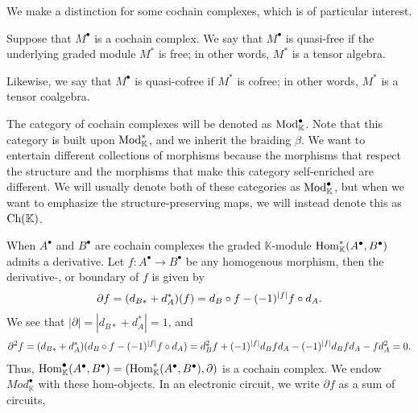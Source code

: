 \documentclass[../thesis.tex]{subfiles}
\begin{document}
            We make a distinction for some cochain complexes, which is of particular interest.
            
            \begin{definition}
                Suppose that $M^\bullet$ is a cochain complex. We say that $M^\bullet$ is quasi-free if the underlying graded module $M^*$ is free; in other words, $M^*$ is a tensor algebra.

                Likewise, we say that $M^\bullet$ is quasi-cofree if $M^*$ is cofree; in other words, $M^*$ is a tensor coalgebra.
            \end{definition}

            The category of cochain complexes will be denoted as $\tt{Mod}_\mathbb{K}^\bullet$. Note that this category is built upon $\tt{Mod}_\mathbb{K}^*$, and we inherit the braiding $\beta$. We want to entertain different collections of morphisms because the morphisms that respect the structure and the morphisms that make this category self-enriched are different. We will usually denote both of these categories as $\tt{Mod}_\mathbb{K}^\bullet$, but when we want to emphasize the structure-preserving maps, we will instead denote this as $\tt{Ch}(\mathbb{K})$.

            When $A^\bullet$ and $B^\bullet$ are cochain complexes the graded $\mathbb{K}$-module $\tt{Hom}_\mathbb{K}^*(A^\bullet, B^\bullet)$ admits a derivative. Let $f : A^\bullet \rightarrow B^\bullet$ be any homogenous morphism, then the derivative-, or boundary of $f$ is given by
            \begin{align*}
                \partial f = (d_{B*} + d_A^*)(f) = d_B \circ f - (-1)^{|f|}f\circ d_A\tt{.}
            \end{align*}
            We see that $|\partial| = |d_{B*} + d_A^*| = 1$, and
            \begin{align*}
                \partial^2f = (d_{B*} + d_A^*)(d_B \circ f - (-1)^{|f|}f\circ d_A) = d_B^2f + (-1)^{|f|}d_Bfd_A - (-1)^{|f|}d_Bfd_A - fd_A^2 = 0\tt{.}
            \end{align*}
            Thus, $\tt{Hom}_\mathbb{K}^\bullet(A^\bullet, B^\bullet) = (\tt{Hom}_\mathbb{K}^*(A^\bullet, B^\bullet), \partial)$ is a cochain complex. We endow $Mod_\mathbb{K}^\bullet$ with these hom-objects. In an electronic circuit, we write $\partial f$ as a sum of circuits,
            
\end{document}
